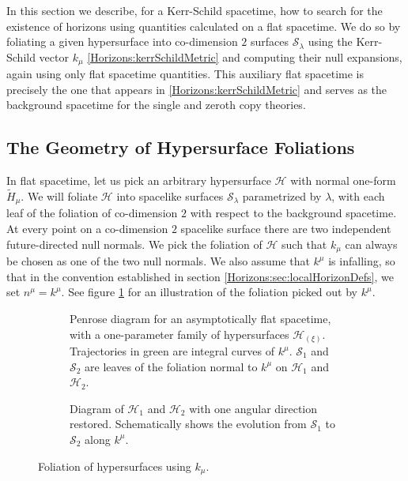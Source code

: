 In this section we describe, for a Kerr-Schild spacetime, how to search for the existence of horizons using
quantities calculated on a flat spacetime. We do so by foliating a given hypersurface into co-dimension $2$
surfaces $\mathcal{S}_{\lambda}$ using the Kerr-Schild vector $k_{\mu}$ \eqref{Horizons:kerrSchildMetric} and computing
their null expansions, again using only flat spacetime quantities. This auxiliary flat spacetime is precisely the
one that appears in \eqref{Horizons:kerrSchildMetric} and serves as the background spacetime for the single and zeroth copy
theories.

\subsection{The Geometry of Hypersurface Foliations}
In flat spacetime, let us pick an arbitrary hypersurface $\mathcal{H}$ with normal one-form $\tilde{H}_{\mu}$.
We will foliate $\mathcal{H}$ into spacelike surfaces $\mathcal{S}_{\lambda}$ parametrized by $\lambda$, with each
leaf of the foliation of co-dimension $2$ with respect to the background spacetime. At every point on a
co-dimension $2$ spacelike surface there are two independent future-directed null normals. We pick the foliation of
$\mathcal{H}$ such that $k_{\mu}$ can always be chosen as one of the two null normals. We also assume that $k^\mu$
is infalling, so that in the convention established in section \ref{Horizons:sec:localHorizonDefs}, we
set $n^\mu = k^\mu.$ See figure \ref{Horizons:figGeneric} for an illustration of the foliation picked out by $k^{\mu}$.
\begin{figure}[h]
    \centering
    \begin{subfigure}[t]{0.55\textwidth}
        \centering
        \def\svgwidth{\columnwidth}
        
        \caption{Penrose diagram for an asymptotically flat spacetime, with a one-parameter family of hypersurfaces
        $\mathcal{H}_{(\xi)}$. Trajectories in green are integral curves of $k^{\mu}$. $\mathcal{S}_{1}$ and
    $\mathcal{S}_{2}$ are leaves of the foliation normal to $k^{\mu}$ on $\mathcal{H}_{1}$ and $\mathcal{H}_{2}$.}
    \end{subfigure}\hspace{2em}%
    \begin{subfigure}[t]{0.32\textwidth}
        \centering
        \def\svgwidth{\columnwidth}
        
        \caption{Diagram of $\mathcal{H}_{1}$ and $\mathcal{H}_{2}$ with one angular direction restored.
        Schematically shows the evolution from $\mathcal{S}_{1}$ to $\mathcal{S}_{2}$ along $k^{\mu}$.}
    \end{subfigure}
    \caption{Foliation of hypersurfaces using $k_{\mu}$.}
    \label{Horizons:figGeneric}
\end{figure}

